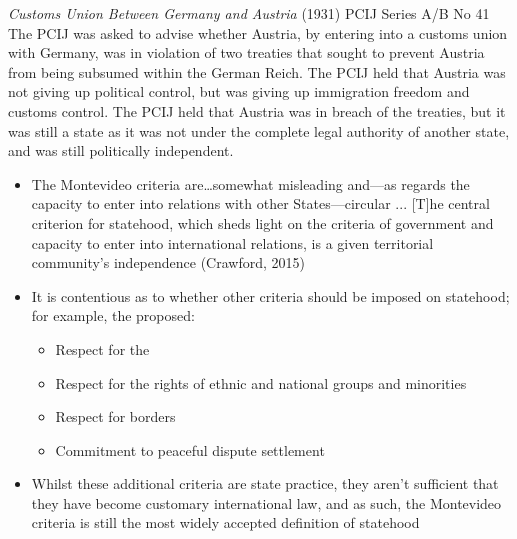 \begin{casedetails}{\textit{Customs Union Between Germany and Austria} (1931) PCIJ Series A/B No 41}
  \flushleft
  The PCIJ was asked to advise whether Austria, by entering into a customs union with Germany, was in violation of two treaties that sought to prevent Austria from being subsumed within the German Reich. The PCIJ held that Austria was not giving up political control, but was giving up immigration freedom and customs control. The PCIJ held that Austria was in breach of the treaties, but it was still a state as it was not under the complete legal authority of another state, and was still politically independent.
\end{casedetails}

\begin{itemize}
    \item The Montevideo criteria are…somewhat misleading and—as regards the capacity to enter into relations with other States—circular ... [T]he central criterion for statehood, which sheds light on the criteria of government and capacity to enter into international relations, is a given territorial community's independence (Crawford, 2015)
    \item It is contentious as to whether other criteria should be imposed on statehood; for example, the  proposed:
    \begin{itemize}
        \item Respect for the 
        \item Respect for the rights of ethnic and national groups and minorities
        \item Respect for borders
        \item Commitment to peaceful dispute settlement
    \end{itemize}
    \item Whilst these additional criteria are state practice, they aren't sufficient that they have become customary international law, and as such, the Montevideo criteria is still the most widely accepted definition of statehood
\end{itemize}

